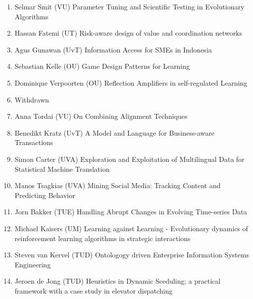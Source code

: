 \begin{multicols}{2}
\begin{scriptsize}
\begin{enumerate}[leftmargin=*,noitemsep,topsep=0pt,parsep=1pt,partopsep=0pt]
\item Selmar Smit (VU) Parameter Tuning and Scientific Testing in Evolutionary Algorithms 
\item Hassan Fatemi (UT) Risk-aware design of value and coordination networks
\item Agus Gunawan (UvT) Information Access for SMEs in Indonesia
\item Sebastian Kelle (OU) Game Design Patterns for Learning
\item Dominique Verpoorten (OU) Reflection Amplifiers in self-regulated Learning 
\item Withdrawn 
\item Anna Tordai (VU) On Combining Alignment Techniques 
\item Benedikt Kratz (UvT) A Model and Language for Business-aware Transactions
\item Simon Carter (UVA) Exploration and Exploitation of Multilingual Data for Statistical Machine Translation
\item Manos Tsagkias (UVA) Mining Social Media: Tracking Content and Predicting Behavior
\item Jorn Bakker (TUE) Handling Abrupt Changes in Evolving Time-series Data
\item Michael Kaisers (UM) Learning against Learning - Evolutionary dynamics of reinforcement learning algorithms in strategic interactions
\item Steven van Kervel (TUD) Ontologogy driven Enterprise Information Systems Engineering
\item Jeroen de Jong (TUD) Heuristics in Dynamic Sceduling; a practical framework with a case study in elevator dispatching
\end{enumerate}


\end{scriptsize}
\end{multicols}
